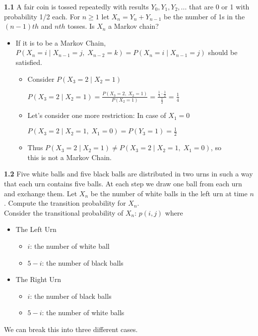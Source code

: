 \documentclass[12pt]{article}
\begin{document}
\newpage\noindent
\textbf{1.1} A fair coin is tossed repeatedly with results $Y_0, Y_1, Y_2, . . .$ that are 0 or 1
with probability 1/2 each. For $n \ge 1$ let $X_n = Y_n + Y_{n-1}$ be the number of 1\textquotesingle s
in the $(n - 1)th$ and $nth$ tosses. Is $X_n$ a Markov chain?\\

\begin{itemize}
    \item If it is to be a Markov Chain,\\ 
    $P(X_n = i\;|\;X_{n-1} = j,\; X_{n-2} = k) = P(X_n = i\;|\;X_{n-1} = j)$ should be satisfied.
    
    \begin{itemize}
        \item Consider $P(X_3 =2\;|\;X_2=1)$
        
          $P(X_3 =2\;|\;X_2=1) = \frac{P(X_3=2,\; X_2=1)}{P(X_2 = 1)} = \frac{\frac{1}{4}\cdot\frac{1}{2}}{\frac{1}{2}} =\frac{1}{4}$ \\
    
    \item Let's consider one more restriction: In case of $X_1=0$
        
            $P(X_3 =2\;|\;X_2=1,\;X_1=0) = P(Y_3 = 1) = \frac{1}{2}$\\
    
    \item Thus $P(X_3 =2\;|\;X_2=1) \neq P(X_3 =2\;|\;X_2=1,\;X_1=0)$, so\\ 
          this is not a Markov Chain.
        
        
    
    \end{itemize}
\end{itemize}


\newpage\noindent
\textbf{1.2} Five white balls and five black balls are distributed in two urns in such a
way that each urn contains five balls. At each step we draw one ball from each
urn and exchange them. Let $X_n$ be the number of white balls in the left urn at
time $n$. Compute the transition probability for $X_n$.\\

\noindent
Consider the transitional probability of $X_n$: $p(i,j)$ where 
\begin{itemize}
    \item The Left Urn
        \begin{itemize}
            \item $i$: the number of white ball 
            \item $5-i$: the number of black balls
        \end{itemize}
    \item The Right Urn
        \begin{itemize}
            \item $i$: the number of black balls 
            \item $5-i$: the number of white balls
        \end{itemize}
\end{itemize}
We can break this into three different cases.
\end{document}
